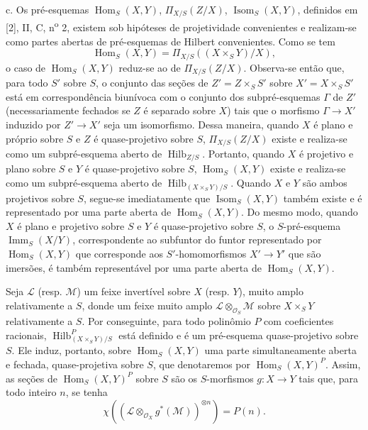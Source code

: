 \medskip
\noindent c. Os pré-esquemas $\operatorname{Hom}_S(X,Y)$,
$\Pi_{X/S}(Z/X)$, $\operatorname{Isom}_S(X,Y)$, definidos em [2], II, C,
n\textsuperscript{o} 2, existem sob hipóteses de projetividade convenientes e
realizam-se como partes abertas de pré-esquemas de Hilbert convenientes. Como se
tem
\[
\operatorname{Hom}_S(X,Y)=\Pi_{X/S}((X\times_SY)/X),
\]
o caso de $\operatorname{Hom}_S(X,Y)$ reduz-se ao de $\Pi_{X/S}(Z/X)$.
Observa-se então que, para todo $S'$ sobre $S$, o conjunto das seções de
$Z'=Z\times_SS'$ sobre $X'=X\times_SS'$ está em correspondência biunívoca com
o conjunto dos subpré-esquemas $\Gamma$ de $Z'$ (necessariamente fechados se
$Z$ é separado sobre $X$) tais que o morfismo $\Gamma\longrightarrow X'$
induzido por $Z'\longrightarrow X'$ seja um isomorfismo. Dessa maneira,
quando $X$ é plano e próprio sobre $S$ e $Z$ é quase-projetivo sobre $S$,
$\Pi_{X/S}(Z/X)$ existe e realiza-se como um subpré-esquema aberto de
$\operatorname{Hilb}_{Z/S}$. Portanto, quando $X$ é projetivo e plano sobre
$S$ e $Y$ é quase-projetivo sobre $S$, $\operatorname{Hom}_S(X,Y)$ existe e
realiza-se como um subpré-esquema aberto de
$\operatorname{Hilb}_{(X\times_SY)/S}$. Quando $X$ e $Y$ são ambos projetivos
sobre $S$, segue-se imediatamente que $\operatorname{Isom}_S(X,Y)$ também
existe e é representado por uma parte aberta de
$\operatorname{Hom}_S(X,Y)$. Do mesmo modo, quando $X$ é plano e projetivo
sobre $S$ e $Y$ é quase-projetivo sobre $S$, o $S$-pré-esquema
$\operatorname{Imm}_S(X/Y)$, correspondente ao subfuntor do funtor representado
por $\operatorname{Hom}_S(X,Y)$ que corresponde aos $S'$-homomorfismos
$X'\longrightarrow Y'$ que são imersões, é também representável por uma
parte aberta de $\operatorname{Hom}_S(X,Y)$.

Seja $\mathcal L$ (resp. $\mathcal M$) um feixe invertível sobre $X$ (resp.
$Y$), muito amplo relativamente a $S$, donde um feixe muito amplo
$\mathcal L\otimes_{\mathcal O_S}\mathcal M$ sobre $X\times_SY$ relativamente a
$S$. Por conseguinte, para todo polinômio $P$ com coeficientes racionais,
$\operatorname{Hilb}^P_{(X\times_SY)/S}$ está definido e é um pré-esquema
quase-projetivo sobre $S$. Ele induz, portanto, sobre
$\operatorname{Hom}_S(X,Y)$ uma parte simultaneamente aberta e fechada,
quase-projetiva sobre $S$, que denotaremos por
$\operatorname{Hom}_S(X,Y)^P$. Assim, as seções de
$\operatorname{Hom}_S(X,Y)^P$ sobre $S$ são os $S$-morfismos
$g:X\longrightarrow Y$ tais que, para todo inteiro $n$, se tenha
\[
\chi\!\left(\left(\mathcal L\otimes_{\mathcal O_X}g^*(\mathcal M)\right)^{
\otimes n}\right)=P(n).
\]

